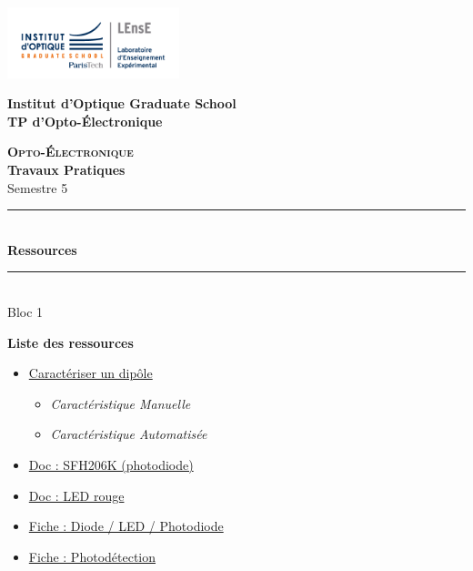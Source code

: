\documentclass[a4paper,11pt,titlepage]{article} %
\begin{document}
\newpage
\begin{center}
	\begin{minipage}{2.5cm}
	\begin{center}
		\includegraphics[width=5cm]{images/Logo-LEnsE.png}
	\end{center}
\end{minipage}\hfill
\begin{minipage}{10cm}
	\begin{center}
	\textbf{Institut d'Optique Graduate School }\\[0.1cm]
    \textbf{TP d'Opto-Électronique}


	\end{center}
\end{minipage}\hfill


\vspace{2cm}


{\Large \bfseries \textsc{Opto-Électronique}} \\[0.5cm]
{\large \bfseries Travaux Pratiques} \\[0.2cm]
Semestre 5

\vspace{1cm}

\rule{\linewidth}{0.4mm} \\[0.4cm]
{ \Large \bfseries\color{violet_iogs} Ressources \\[0.4cm] }
\rule{\linewidth}{0.4mm} \\[1cm]
{\large Bloc 1}

\end{center}

\vspace{3cm}

\textbf{\large Liste des ressources}
\begin{itemize}
	\item \hyperref[ressource:CaracStat]{Caractériser un dipôle}
	\begin{itemize}
		\item \textit{Caractéristique Manuelle}
		\item \textit{Caractéristique Automatisée}
	\end{itemize}
	\item \hyperref[doc:phdSFH206K]{Doc : SFH206K (photodiode)}
	\item \hyperref[doc:ledRouge]{Doc : LED rouge}
	\item \hyperref[fiche:Led]{Fiche : Diode / LED / Photodiode}
	\item \hyperref[fiche:Photodetect]{Fiche : Photodétection}
\end{itemize}
\end{document}
